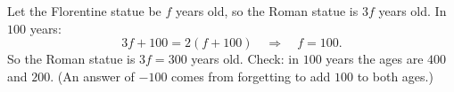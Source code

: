 Let the Florentine statue be $f$ years old, so the Roman statue is $3f$ years old. In $100$ years:
\[
3f+100=2(f+100)\quad\Longrightarrow\quad f=100 .
\]
So the Roman statue is $3f=\boxed{300}$ years old. Check: in $100$ years the ages are $400$ and $200$. (An answer of $-100$ comes from forgetting to add $100$ to both ages.)
